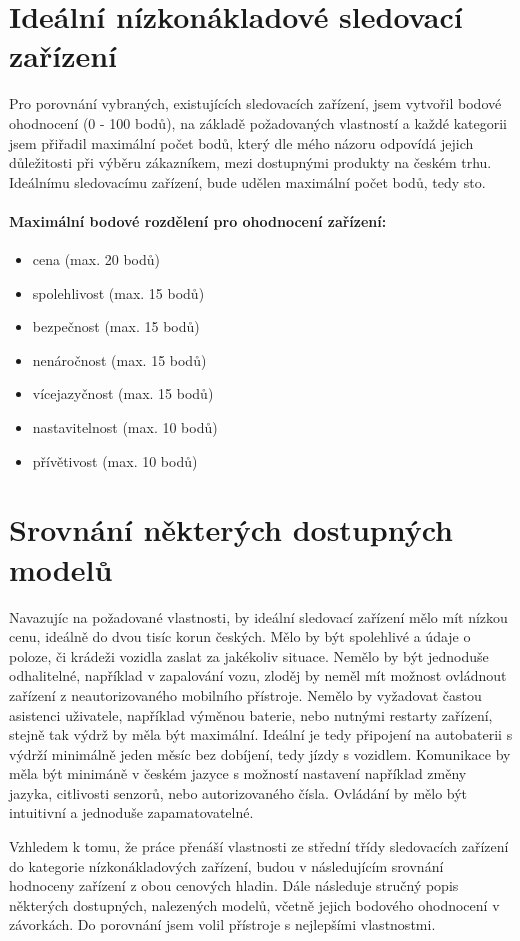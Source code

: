 \documentclass[FM,MP]{tulthesis}  %
\begin{document}
\section{Ideální nízkonákladové sledovací zařízení}
Pro porovnání vybraných, existujících sledovacích zařízení, jsem vytvořil bodové ohodnocení (0 - 100 bodů), na základě požadovaných vlastností a každé kategorii jsem přiřadil maximální počet bodů, který dle mého názoru odpovídá jejich důležitosti při výběru zákazníkem, mezi dostupnými produkty na českém trhu. Ideálnímu sledovacímu zařízení, bude udělen maximální počet bodů, tedy sto.

\paragraph{Maximální bodové rozdělení pro ohodnocení zařízení:}
\begin{itemize}
\item cena (max. 20 bodů)
\item spolehlivost (max. 15 bodů)
\item bezpečnost (max. 15 bodů)
\item nenáročnost (max. 15 bodů)
\item vícejazyčnost (max. 15 bodů)
\item nastavitelnost (max. 10 bodů)
\item přívětivost (max. 10 bodů)
\end{itemize}

\section{Srovnání některých dostupných modelů}
Navazujíc na požadované vlastnosti, by ideální sledovací zařízení mělo mít nízkou cenu, ideálně do dvou tisíc korun českých. Mělo by být spolehlivé a údaje o poloze, či krádeži vozidla zaslat za jakékoliv situace. Nemělo by být jednoduše odhalitelné, například v zapalování vozu, zloděj by neměl mít možnost ovládnout zařízení z neautorizovaného mobilního přístroje. Nemělo by vyžadovat častou asistenci uživatele, například výměnou baterie, nebo nutnými restarty zařízení, stejně tak výdrž by měla být maximální. Ideální je tedy připojení na autobaterii s výdrží minimálně jeden měsíc bez dobíjení, tedy jízdy s vozidlem. Komunikace by měla být minimáně v českém jazyce s možností nastavení například změny jazyka, citlivosti senzorů, nebo autorizovaného čísla. Ovládání by mělo být intuitivní a jednoduše zapamatovatelné.

Vzhledem k tomu, že práce přenáší vlastnosti ze střední třídy sledovacích zařízení do kategorie nízkonákladových zařízení, budou v následujícím srovnání hodnoceny zařízení z obou cenových hladin. Dále následuje stručný popis některých dostupných, nalezených modelů, včetně jejich bodového ohodnocení v závorkách. Do porovnání jsem volil přístroje s nejlepšími vlastnostmi.
\end{document}
